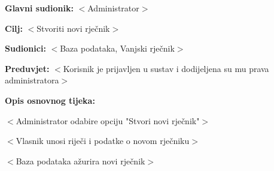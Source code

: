 					\noindent {}
					\begin{packed_item}
	
						\item \textbf{Glavni sudionik: }$<$Administrator$>$
						\item  \textbf{Cilj:} $<$Stvoriti novi rječnik$>$
						\item  \textbf{Sudionici:} $<$Baza podataka, Vanjski rječnik$>$
						\item  \textbf{Preduvjet:} $<$Korisnik je prijavljen u sustav i dodijeljena su mu prava administratora$>$
						\item  \textbf{Opis osnovnog tijeka:}
						
						\item[] \begin{packed_enum}
	
							\item $<$Administrator odabire opciju "Stvori novi rječnik"$>$
							\item $<$Vlasnik unosi riječi i podatke o novom rječniku$>$
							\item $<$Baza podataka ažurira novi rječnik$>$
						\end{packed_enum}
						
					\end{packed_item}

